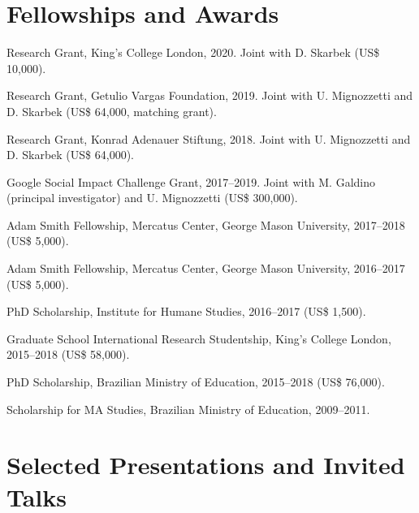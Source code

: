\documentclass[a4paper]{article}
\renewenvironment{itemize}{
	\begin{list}{}{
			\setlength{\leftmargin}{1.5em}
		}
		}{
	\end{list}
}
\begin{document}
\section*{Fellowships and Awards}

\begin{itemize}
\item Research Grant, King's College London, 2020. Joint with D. Skarbek (US\$ 10,000).
\item Research Grant, Getulio Vargas Foundation, 2019. Joint with U. Mignozzetti and D. Skarbek (US\$ 64,000, matching grant).
\item Research Grant, Konrad Adenauer Stiftung, 2018. Joint with U. Mignozzetti and D. Skarbek (US\$ 64,000).
\item Google Social Impact Challenge Grant, 2017--2019. Joint with M. Galdino (principal investigator) and U. Mignozzetti (US\$ 300,000).
\item Adam Smith Fellowship, Mercatus Center, George Mason University, 2017--2018 (US\$ 5,000).
\item Adam Smith Fellowship, Mercatus Center, George Mason University, 2016--2017 (US\$ 5,000).
\item PhD Scholarship, Institute for Humane Studies, 2016--2017 (US\$ 1,500).
\item Graduate School International Research Studentship, King's College London, 2015--2018 (US\$ 58,000).
\item PhD Scholarship, Brazilian Ministry of Education, 2015--2018 (US\$ 76,000).
\item Scholarship for MA Studies, Brazilian Ministry of Education, 2009--2011.
\end{itemize}

\section*{Selected Presentations and Invited Talks}
\end{document}
